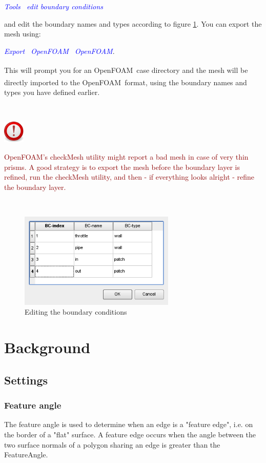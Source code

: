 \documentclass[10pt,a4paper,british]{book}
\newcommand\foam{OpenFOAM\textsuperscript{\textregistered}\ }
\newcommand\arr{\guillemotright\ }
\newcommand\menu[1]{\textcolor{blue}{\it \hspace{5mm} #1}}
\newcommand\important[1]
{
  $~$\\
  \begin{minipage}{15mm}
    \includegraphics[width=1cm]{figures/important}
  \end{minipage}
  \begin{minipage}{110mm}
    \begin{flushleft}
      {\textcolor{darkred}{#1}}
    \end{flushleft}
  \end{minipage}
  \\
  \vspace{3mm}
}
\begin{document}
\menu{Tools \arr edit boundary conditions}

and edit the boundary names and types according to figure \ref{fig:T1_scr10}. You can export the mesh using:

\menu{Export \arr OpenFOAM \arr  OpenFOAM}.

This will prompt you for an \foam case directory and the mesh will be directly imported to the \foam format, using the boundary names and types you have defined earlier.

\important
{
  OpenFOAM's checkMesh utility might report a bad mesh
  in case of very thin prisms. A good strategy is to export the mesh
  before the boundary layer is refined, run the checkMesh utility, and
  then - if everything looks alright - refine the boundary layer.
}
\begin{figure}
  \begin{centering}
    \includegraphics[width=74mm]{figures/tutorials/T1/scr10}
    \par
  \end{centering}
  \caption{Editing the boundary conditions}
  \label{fig:T1_scr10}
\end{figure}

\chapter{Background}

\section{Settings}

\subsection{Feature angle}
The feature angle is used to determine when an edge is a "feature edge", i.e. on the border of a "flat" surface.
A feature edge occurs when the angle between the two surface normals of a polygon sharing an edge is greater than the FeatureAngle.
\end{document}
